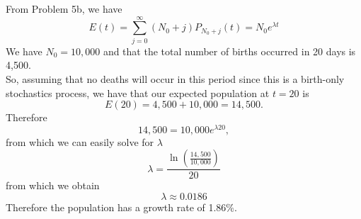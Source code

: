 From Problem 5b, we have
$$
E(t) = \sum_{j=0}^{\infty} (N_{0}+j)P_{N_{0}+j}(t) = N_{0}e^{\lambda t}
$$
We have $N_{0}=10,000$ and that the total number of births occurred in 20 days is 4,500.\\
So, assuming that no deaths will occur in this period since this is a birth-only stochastics process, we have that our expected population at $t=20$ is
$$
E(20) = 4,500 + 10,000 = 14,500.
$$
Therefore
$$
14,500 = 10,000e^{\lambda 20},
$$
from which we can easily solve for $\lambda$
$$
\lambda = \frac{\ln \left(\frac{14,500}{10,000}\right)}{20}
$$
from which we obtain
$$
\lambda \approx 0.0186
$$
Therefore the population has a growth rate of 1.86\%.